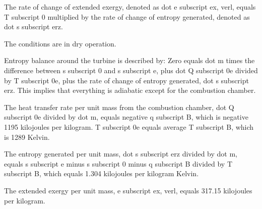 The rate of change of extended exergy, denoted as dot e subscript ex, verl, equals T subscript 0 multiplied by the rate of change of entropy generated, denoted as dot s subscript erz.

The conditions are in dry operation.

Entropy balance around the turbine is described by:
Zero equals dot m times the difference between s subscript 0 and s subscript e, plus dot Q subscript 0e divided by T subscript 0e, plus the rate of change of entropy generated, dot s subscript erz.
This implies that everything is adiabatic except for the combustion chamber.

The heat transfer rate per unit mass from the combustion chamber, dot Q subscript 0e divided by dot m, equals negative q subscript B, which is negative 1195 kilojoules per kilogram.
T subscript 0e equals average T subscript B, which is 1289 Kelvin.

The entropy generated per unit mass, dot s subscript erz divided by dot m, equals s subscript e minus s subscript 0 minus q subscript B divided by T subscript B, which equals 1.304 kilojoules per kilogram Kelvin.

The extended exergy per unit mass, e subscript ex, verl, equals 317.15 kilojoules per kilogram.